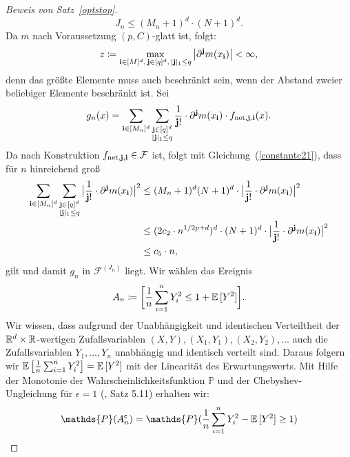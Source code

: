 \begin{proof}[Beweis von Satz~\ref{optstop}]
\begin{equation}
\label{jn}
J_n \leq (M_n + 1)^d \cdot (N + 1)^d.
\end{equation}
Da $m$ nach Voraussetzung $(p,C)$-glatt ist, folgt:
\begin{equation}
\label{bound}
z \coloneqq \max_{\mathbf{i} \in [M]^d,\, \mathbf{j} \in [q]^d,\, |\mathbf{j}|_1 \leq q} \big|\partial^{\mathbf{j}}m(x_{\mathbf{i}})\big| < \infty,
\end{equation}
denn das größte Elemente muss auch beschränkt sein, wenn der Abstand zweier beliebiger Elemente beschränkt ist.
Sei 
$$g_n(x) = \sum_{\mathbf{i} \in [M_n]^d} \sum_{\substack{ \mathbf{j} \in [q]^d \\ |\mathbf{j}|_1 \leq q}} \frac{1}{\mathbf{j}!} \cdot \partial^{\mathbf{j}}m(x_{\mathbf{i}}) \cdot f_{\mathrm{net},\mathbf{j},\mathbf{i}}(x).$$
Da nach Konstruktion $f_{\mathrm{net},\mathbf{j},\mathbf{i}} \in \mathcal{F}$ ist, folgt mit Gleichung~(\ref{constantc21}), dass für $n$ hinreichend groß
\begin{equation*}
\begin{split}
\sum_{\mathbf{i} \in [M_n]^d} \sum_{\substack{ \mathbf{j} \in [q]^d \\ |\mathbf{j}|_1 \leq q}} \big| \frac{1}{\mathbf{j}!} \cdot \partial^{\mathbf{j}}m(x_{\mathbf{i}})\big|^2 & \leq (M_n + 1)^d (N + 1)^d \cdot \big|\frac{1}{\mathbf{j}!} \cdot \partial^{\mathbf{j}}m(x_{\mathbf{i}})\big|^2 \\
& \leq (2 c_2 \cdot n^{1/2p + d})^d \cdot (N + 1)^d \cdot \big|\frac{1}{\mathbf{j}!} \cdot \partial^{\mathbf{j}}m(x_{\mathbf{i}})\big|^2 \\
& \leq c_5 \cdot n,
\end{split}
\end{equation*}
gilt und damit $g_n$ in $\mathcal{F}^{(J_n)}$ liegt. 
Wir wählen das Ereignis 
\begin{equation}
\label{event}
A_n \coloneqq \bigg[\frac{1}{n} \sum_{i = 1}^n Y_i^2 \leq 1 + \mathbb{E}\,[Y^2]\bigg].
\end{equation}
Wir wissen, dass aufgrund der Unabhängigkeit und identischen Verteiltheit der $\mathbb{R}^d \times \mathbb{R}$-wertigen Zufallsvariablen  $(X, Y), (X_1, Y_1), (X_2, Y_2), \dots$ auch die Zufallsvariablen $Y_1,\dots,Y_n$ unabhängig und identisch verteilt sind. 
Daraus folgern wir $\mathbb{E}\,\big[\frac{1}{n} \sum_{i = 1}^n Y_i^2\big] = \mathbb{E}\,[Y^2]$ mit der Linearität des Erwartungswerts.
Mit Hilfe der Monotonie der Wahrscheinlichkeitsfunktion $\mathds{P}$ und der Chebyshev-Ungleichung für $\epsilon = 1$ (\cite{Klenke2013}, Satz 5.11) erhalten wir:
\begin{equation*}
\begin{split}
\mathds{P}(A_n^{\mathsf{c}}) & = \mathds{P}(\frac{1}{n}\sum_{i=1}^n Y_i^2 - \E[Y^2] \geq 1) \\

\end{split}
\end{equation*}
\end{proof}
